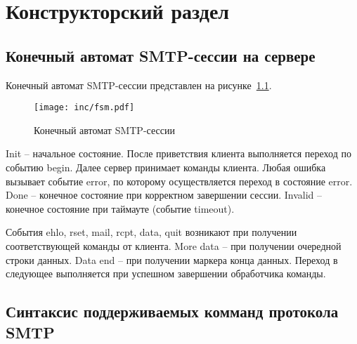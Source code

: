 \chapter{Конструкторский раздел}
\label{cha:design}

\section{Конечный автомат SMTP-сессии на сервере}

Конечный автомат SMTP-сессии представлен на рисунке~\ref{fig:fsm}.

\begin{figure}
\centering
\texttt{[image: inc/fsm.pdf]}
\caption{Конечный автомат SMTP-сессии}
\label{fig:fsm}
\end{figure}

Init -- начальное состояние.
После приветствия клиента выполняется переход по событию begin.
Далее сервер принимает команды клиента.
Любая ошибка вызывает событие error, по которому осуществляется переход в состояние error.
Done -- конечное состояние при корректном завершении сессии.
Invalid -- конечное состояние при таймауте (событие timeout).

События ehlo, rset, mail, rcpt, data, quit возникают при получении соответствующей команды от клиента.
More data -- при получении очередной строки данных.
Data end -- при получении маркера конца данных.
Переход в следующее выполняется при успешном завершении обработчика команды.

\section{Синтаксис поддерживаемых комманд протокола SMTP}

